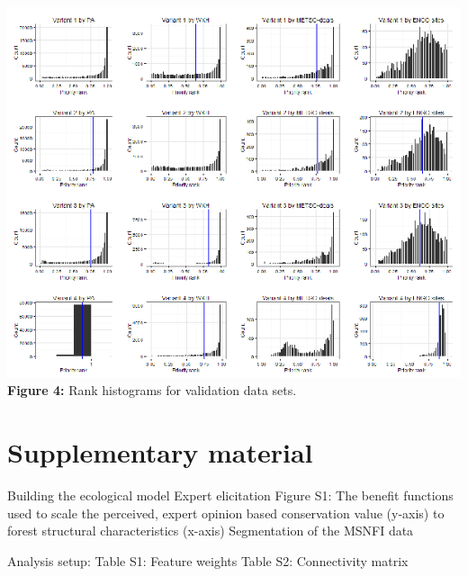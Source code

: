 \documentclass[]{article}
\begin{document}
\includegraphics{figs/Fig4_w600.png}\\\textbf{Figure 4:} Rank histograms
for validation data sets.

\clearpage

\section{Supplementary material}

Building the ecological model Expert elicitation Figure S1: The benefit
functions used to scale the perceived, expert opinion based conservation
value (y-axis) to forest structural characteristics (x-axis)
Segmentation of the MSNFI data

Analysis setup: Table S1: Feature weights Table S2: Connectivity matrix
\end{document}
